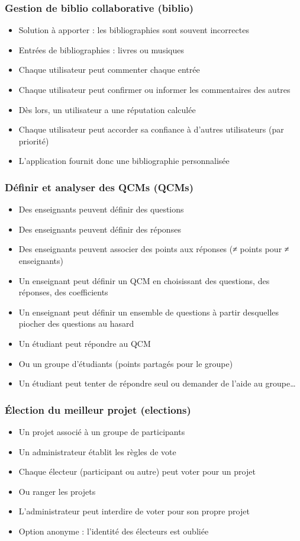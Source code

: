 \documentclass[english, french]{beamer}
\begin{document}
\begin{frame}
	\frametitle{Gestion de biblio collaborative (biblio)}
	\begin{itemize}
		\item Solution à apporter : les bibliographies sont souvent incorrectes
		\item Entrées de bibliographies : livres ou musiques
		\item Chaque utilisateur peut commenter chaque entrée
		\item Chaque utilisateur peut confirmer ou informer les commentaires des autres
		\item Dès lors, un utilisateur a une réputation calculée
		\item Chaque utilisateur peut accorder sa confiance à d’autres utilisateurs (par priorité)
		\item L’application fournit donc une bibliographie personnalisée
	\end{itemize}
\end{frame}

\begin{frame}
	\frametitle{Définir et analyser des QCMs (QCMs)}
	\begin{itemize}
		\item Des enseignants peuvent définir des questions
		\item Des enseignants peuvent définir des réponses
		\item Des enseignants peuvent associer des points aux réponses ({≠} points pour ≠ enseignants)
		\item Un enseignant peut définir un QCM en choisissant des questions, des réponses, des coefficients
		\item Un enseignant peut définir un ensemble de questions à partir desquelles piocher des questions au hasard
		\item Un étudiant peut répondre au QCM
		\item Ou un groupe d’étudiants (points partagés pour le groupe)
		\item Un étudiant peut tenter de répondre seul ou demander de l’aide au groupe…
	\end{itemize}
\end{frame}

\begin{frame}
	\frametitle{Élection du meilleur projet (elections)}
	\begin{itemize}
		\item Un projet associé à un groupe de participants
		\item Un administrateur établit les règles de vote
		\item Chaque électeur (participant ou autre) peut voter pour un projet
		\item Ou ranger les projets
		\item L’administrateur peut interdire de voter pour son propre projet
		\item Option anonyme : l’identité des électeurs est oubliée
	\end{itemize}
\end{frame}
\end{document}
